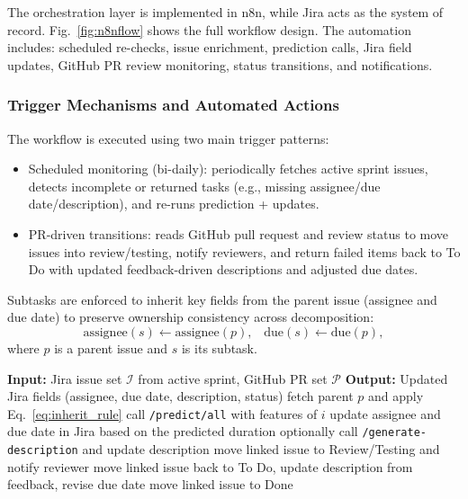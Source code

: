 \documentclass[conference]{IEEEtran}
\begin{document}
The orchestration layer is implemented in n8n, while Jira acts as the system of record. Fig.~\ref{fig:n8nflow} shows the full workflow design. The automation includes: scheduled re-checks, issue enrichment, prediction calls, Jira field updates, GitHub PR review monitoring, status transitions, and notifications.

\subsubsection{Trigger Mechanisms and Automated Actions}
The workflow is executed using two main trigger patterns:
\begin{itemize}
    \item Scheduled monitoring (bi-daily): periodically fetches active sprint issues, detects incomplete or returned tasks (e.g., missing assignee/due date/description), and re-runs prediction + updates.
    \item PR-driven transitions: reads GitHub pull request and review status to move issues into review/testing, notify reviewers, and return failed items back to To Do with updated feedback-driven descriptions and adjusted due dates.
\end{itemize}

Subtasks are enforced to inherit key fields from the parent issue (assignee and due date) to preserve ownership consistency across decomposition:
\begin{equation}
\mathrm{assignee}(s) \leftarrow \mathrm{assignee}(p),\;\;\;
\mathrm{due}(s) \leftarrow \mathrm{due}(p),
\label{eq:inherit_rule}
\end{equation}
where $p$ is a parent issue and $s$ is its subtask.

\begin{algorithm}[t]
\caption{Automated Task Processing Pipeline}
\label{alg:pipeline}
\begin{algorithmic}[1]
\STATE \textbf{Input:} Jira issue set $\mathcal{I}$ from active sprint, GitHub PR set $\mathcal{P}$
\STATE \textbf{Output:} Updated Jira fields (assignee, due date, description, status)
        \STATE fetch parent $p$ and apply Eq.~\eqref{eq:inherit_rule}
    \ENDIF
        \STATE call \texttt{/predict/all} with features of $i$
        \STATE update assignee and due date in Jira based on the predicted duration
        \STATE optionally call \texttt{/generate-description} and update description
    \ENDIF
\ENDFOR
{}
        \STATE move linked issue to Review/Testing and notify reviewer
    \ENDIF
        \STATE move linked issue back to To Do, update description from feedback, revise due date
    \ELSE
        \STATE move linked issue to Done
    \ENDIF
\ENDFOR
\end{algorithmic}
\end{algorithm}
\end{document}
